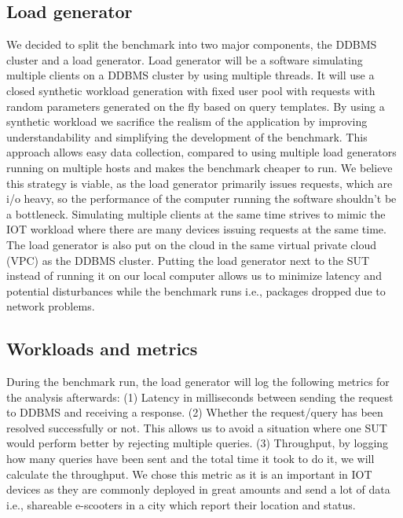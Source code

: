 \subsection{Load generator}
We decided to split the benchmark into two major components, the DDBMS cluster and a load generator.
Load generator will be a software simulating multiple clients on a DDBMS cluster by using multiple threads.
It will use a closed synthetic workload generation with fixed user pool with requests with random parameters generated on the fly based on query templates.
By using a synthetic workload we sacrifice the realism of the application by improving understandability and simplifying the development of the benchmark.
This approach allows easy data collection, compared to using multiple load generators running on multiple hosts and makes the benchmark cheaper to run.
We believe this strategy is viable, as the load generator primarily issues requests, which are i/o heavy, so the performance of the computer running the software shouldn't be a bottleneck.
Simulating multiple clients at the same time strives to mimic the IOT workload where there are many devices issuing requests at the same time.
The load generator is also put on the cloud in the same virtual private cloud (VPC) as the DDBMS cluster.
Putting the load generator next to the SUT instead of running it on our local computer allows us to minimize latency and potential disturbances while the benchmark runs i.e., packages dropped due to network problems.


\subsection{Workloads and metrics}
During the benchmark run, the load generator will log the following metrics for the analysis afterwards:
(1) Latency in milliseconds between sending the request to DDBMS and receiving a response.
(2) Whether the request/query has been resolved successfully or not.
This allows us to avoid a situation where one SUT would perform better by rejecting multiple queries.
(3) Throughput, by logging how many queries have been sent and the total time it took to do it, we will calculate the throughput.
We chose this metric as it is an important in IOT devices as they are commonly deployed in great amounts and send a lot of data i.e., shareable e-scooters in a city which report their location and status.


